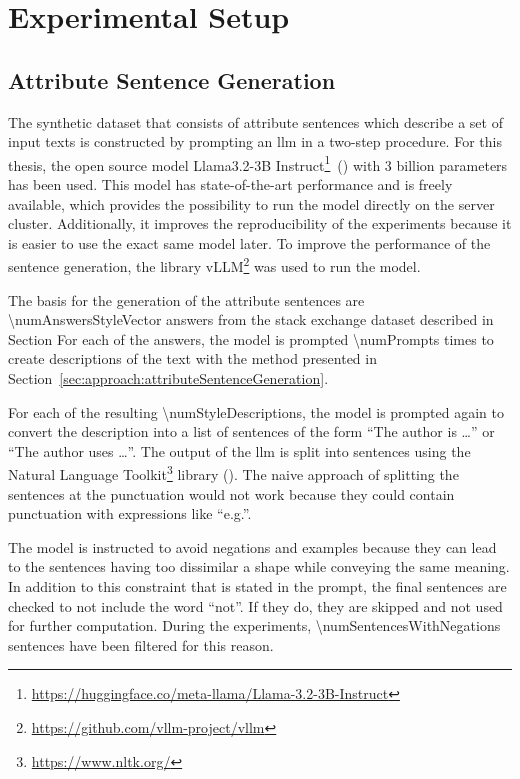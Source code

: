 
\section{Experimental Setup}
\label{sec:experiments:setup}


\subsection{Attribute Sentence Generation}
\label{sec:experiments:setup:sentenceGeneration}
The synthetic dataset that consists of attribute sentences which describe a set of input texts is constructed by prompting an \acs{llm} in a two-step procedure. For this thesis, the open source model Llama3.2-3B Instruct\footnote{\url{https://huggingface.co/meta-llama/Llama-3.2-3B-Instruct}}~(\cite{dubeyLlama3Herd2024}) with \num{3} billion parameters has been used. This model has state-of-the-art performance and is freely available, which provides the possibility to run the model directly on the server cluster. Additionally, it improves the reproducibility of the experiments because it is easier to use the exact same model later.
To improve the performance of the sentence generation, the library vLLM\footnote{\url{https://github.com/vllm-project/vllm}} was used to run the model.

The basis for the generation of the attribute sentences are \num{\numAnswersStyleVector} answers from the stack exchange dataset described in Section %
For each of the answers, the model is prompted \num{\numPrompts} times to create descriptions of the text with the method presented in Section~\ref{sec:approach:attributeSentenceGeneration}.

For each of the resulting \num{\numStyleDescriptions}, the model is prompted again to convert the description into a list of sentences of the form \enquote{The author is \ldots} or \enquote{The author uses \ldots}. The output of the \ac{llm} is split into sentences using the Natural Language Toolkit\footnote{\url{https://www.nltk.org/}} library (\cite{birdNaturalLanguageProcessing2009}). The naive approach of splitting the sentences at the punctuation would not work because they could contain punctuation with expressions like \enquote{e.g.}.

The model is instructed to avoid negations and examples because they can lead to the sentences having too dissimilar a shape while conveying the same meaning. In addition to this constraint that is stated in the prompt, the final sentences are checked to not include the word \enquote{not}. If they do, they are skipped and not used for further computation. During the experiments, \num{\numSentencesWithNegations} sentences have been filtered for this reason.

